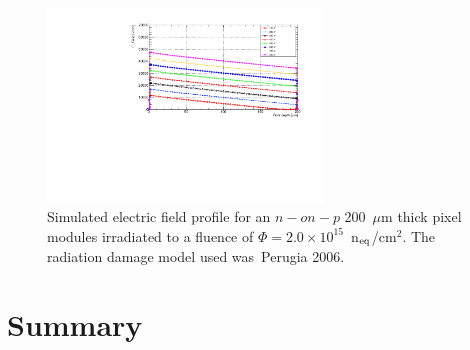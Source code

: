 \begin{figure}[!htpb]
\centering
\includegraphics[width=0.65\textwidth]{EField_Natascha_fl2e15_Petasecca.pdf}
\caption{\label{fig:EField_Profile_Perugia2006}Simulated electric field profile for an $n-on-p$ 200~$\mu$m thick pixel modules irradiated to a fluence of 
$\Phi = 2.0\times10^{15}$~n$_{\rm eq}$/cm$^2$. The radiation damage model used was~Perugia 2006\cite{Moscatelli-2006}.}
\end{figure}

\section{Summary}
\label{sec:TCADSummary}

